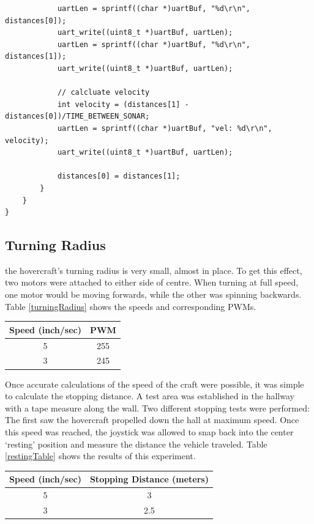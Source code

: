 \begin{lstlisting}
            uartLen = sprintf((char *)uartBuf, "%d\r\n", distances[0]);
            uart_write((uint8_t *)uartBuf, uartLen);
            uartLen = sprintf((char *)uartBuf, "%d\r\n", distances[1]);
            uart_write((uint8_t *)uartBuf, uartLen);

            // calcluate velocity
            int velocity = (distances[1] - distances[0])/TIME_BETWEEN_SONAR;
            uartLen = sprintf((char *)uartBuf, "vel: %d\r\n", velocity);
            uart_write((uint8_t *)uartBuf, uartLen);

            distances[0] = distances[1];
        }
    }
}
\end{lstlisting}

\subsection{Turning Radius}
the hovercraft's turning radius is very small, almost in place. To get this effect, two motors were attached to either side of centre. When turning at full speed, one motor would be moving forwards, while the other was spinning backwards. Table \ref{turningRadius} shows the speeds and corresponding PWMs. 

\begin{minipage}{6.5in}
\begin{center}
\begin{tabular}{ c c }
  Speed (inch/sec) & PWM \\
  \hline
  5 & 255 \\
  3 & 245 \\
\end{tabular}
\end{center}
\label{turningRadius}
\end{minipage}

Once accurate calculations of the speed of the craft were possible, it was simple to calculate the stopping distance.  A test area was established in the hallway with a tape measure along the wall.  Two different stopping tests were performed: The first saw the hovercraft propelled down the hall at maximum speed. Once this speed was reached, the joystick was allowed to snap back into the center `resting' position and measure the distance the vehicle traveled. Table \ref{restingTable} shows the results of this experiment.

\begin{minipage}{6.5in}
\begin{center}
\begin{tabular}{ c c }
  Speed (inch/sec) & Stopping Distance (meters) \\
  \hline
  5 & 3 \\
  3 & 2.5 \\
\end{tabular}
\end{center}
\label{restingTable}
\end{minipage}

